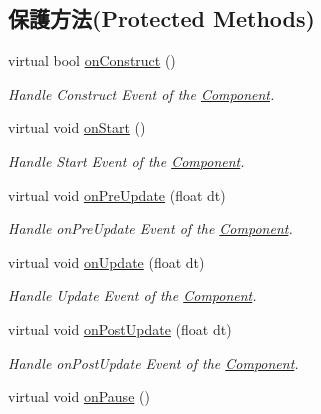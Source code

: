 \subsection*{保護方法(Protected Methods)}
\begin{DoxyCompactItemize}
\item 
virtual bool \hyperlink{class_magnum_1_1_component_1_1_owner_ada62d0f70f59917efb49e4bcbebf3a56}{on\+Construct} ()
\begin{DoxyCompactList}\small\item\em Handle Construct Event of the \hyperlink{class_magnum_1_1_component}{Component}. \end{DoxyCompactList}\item 
virtual void \hyperlink{class_magnum_1_1_component_1_1_owner_a19f60122b850afe5b03c80f49feef56e}{on\+Start} ()\hypertarget{class_magnum_1_1_component_1_1_owner_a19f60122b850afe5b03c80f49feef56e}{}\label{class_magnum_1_1_component_1_1_owner_a19f60122b850afe5b03c80f49feef56e}

\begin{DoxyCompactList}\small\item\em Handle Start Event of the \hyperlink{class_magnum_1_1_component}{Component}. \end{DoxyCompactList}\item 
virtual void \hyperlink{class_magnum_1_1_component_1_1_owner_afb16090797801a819858cf93f53e2113}{on\+Pre\+Update} (float dt)
\begin{DoxyCompactList}\small\item\em Handle on\+Pre\+Update Event of the \hyperlink{class_magnum_1_1_component}{Component}. \end{DoxyCompactList}\item 
virtual void \hyperlink{class_magnum_1_1_component_1_1_owner_a5ab10cdba327e2cff3fd53eddbb094b8}{on\+Update} (float dt)
\begin{DoxyCompactList}\small\item\em Handle Update Event of the \hyperlink{class_magnum_1_1_component}{Component}. \end{DoxyCompactList}\item 
virtual void \hyperlink{class_magnum_1_1_component_1_1_owner_a196e67ddcee045d18d9908255f2e67d3}{on\+Post\+Update} (float dt)
\begin{DoxyCompactList}\small\item\em Handle on\+Post\+Update Event of the \hyperlink{class_magnum_1_1_component}{Component}. \end{DoxyCompactList}\item 
virtual void \hyperlink{class_magnum_1_1_component_1_1_owner_acaea23801155ebf1acbab0d265d8b3d0}{on\+Pause} ()\hypertarget{class_magnum_1_1_component_1_1_owner_acaea23801155ebf1acbab0d265d8b3d0}{}\label{class_magnum_1_1_component_1_1_owner_acaea23801155ebf1acbab0d265d8b3d0}


\end{DoxyCompactItemize}
